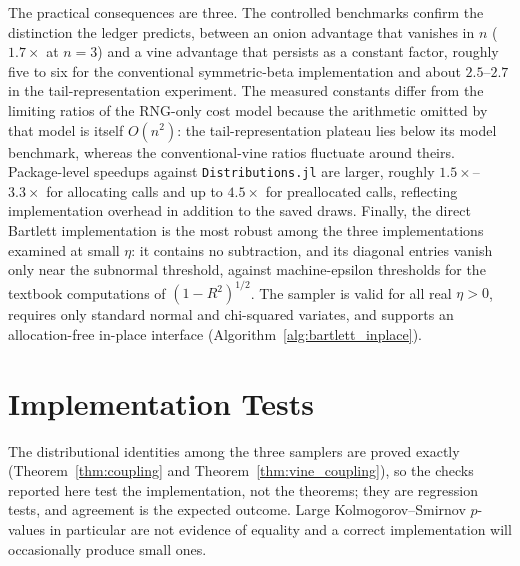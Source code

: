 \documentclass[12pt,english]{article}
\theoremstyle{plain} %
\theoremstyle{definition} %
\theoremstyle{remark} %
\newif\ifincludetests
\newcommand{\xthm}[2]{Theorem~\ref{#1}}
\begin{document}
The practical consequences are three. The controlled benchmarks confirm the distinction the ledger predicts, between an onion advantage that vanishes in $n$ ($1.7\times$ at $n=3$) and a vine advantage that persists as a constant factor, roughly five to six for the conventional symmetric-beta implementation and about $2.5$--$2.7$ in the tail-representation experiment. The measured constants differ from the limiting ratios of the RNG-only cost model because the arithmetic omitted by that model is itself $O(n^2)$: the tail-representation plateau lies below its model benchmark, whereas the conventional-vine ratios fluctuate around theirs. Package-level speedups against \texttt{Distributions.jl} are larger, roughly $1.5\times$--$3.3\times$ for allocating calls and up to $4.5\times$ for preallocated calls, reflecting implementation overhead in addition to the saved draws. Finally, the direct Bartlett implementation is the most robust among the three implementations examined at small $\eta$: it contains no subtraction, and its diagonal entries vanish only near the subnormal threshold, against machine-epsilon thresholds for the textbook computations of $(1-R^2)^{1/2}$. The sampler is valid for all real $\eta>0$, requires only standard normal and chi-squared variates, and supports an allocation-free in-place interface (Algorithm~\ref{alg:bartlett_inplace}).

\ifincludetests
\appendix

\section{Implementation Tests}
\label{app:tests}

The distributional identities among the three samplers are proved exactly (\xthm{thm:coupling}{1} and \xthm{thm:vine_coupling}{2}), so the checks reported here test the implementation, not the theorems; they are regression tests, and agreement is the expected outcome. Large Kolmogorov--Smirnov $p$-values in particular are not evidence of equality and a correct implementation will occasionally produce small ones.
\end{document}
